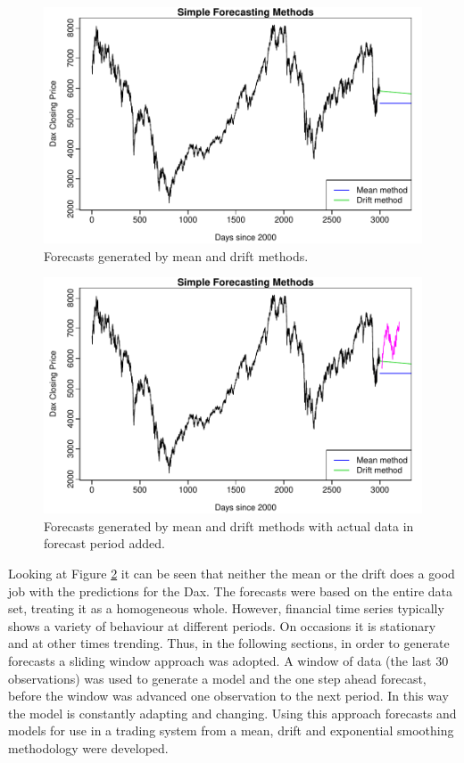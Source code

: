 

\begin{figure}[tbh]
\centering
\includegraphics{Figures/chp_ts_dax1}
\caption[Forecasts generated by mean and drift methods]{Forecasts generated by mean and drift methods.}
\label{fig:chp5_ts_dax}
\end{figure}

\begin{figure}[tbh]
\centering
\includegraphics{Figures/chp_ts_dax1_plus_act_data}
\caption[Forecasts generated by mean and drift methods and actual data]{Forecasts generated by mean and drift methods with actual data in forecast period added.}
\label{fig:chp_ts_dax_act}
\end{figure}

Looking at Figure \ref{fig:chp_ts_dax_act} it can be seen that neither the mean or the drift does a good job with the predictions for the Dax. The forecasts were based on the entire data set, treating it as a homogeneous whole. However, financial time series typically shows a variety of behaviour at different periods. On occasions it is stationary and at other times trending. Thus, in the following sections, in order to generate forecasts a sliding window approach was adopted. A window of data (the last 30 observations) was used to generate a model and the one step ahead forecast, before the window was advanced one observation to the next period. In this way the model is constantly adapting and changing. Using this approach forecasts and models for use in a trading system from a mean, drift and exponential smoothing methodology were developed.

